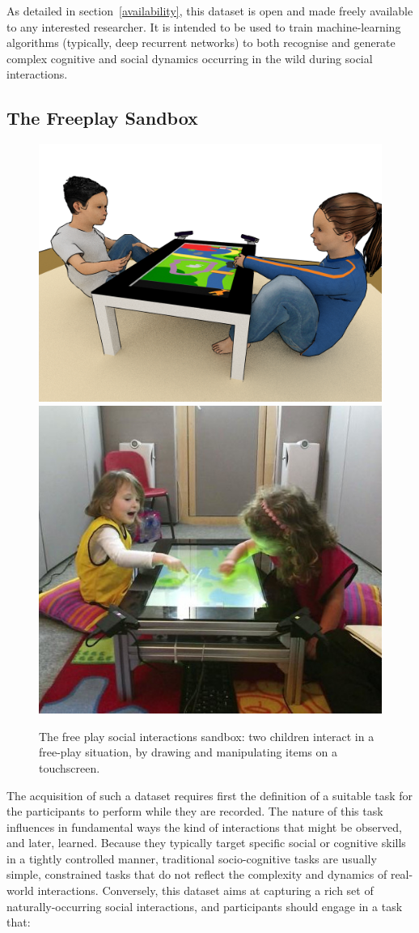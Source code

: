 \documentclass{article}
\begin{document}
As detailed in section~\ref{availability}, this dataset is open and made freely
available to any interested researcher. It is intended to be used to train
machine-learning algorithms (typically, deep recurrent networks) to both
recognise and generate complex cognitive and social dynamics occurring in the
wild during social interactions.

\subsection{The Freeplay Sandbox}

\begin{figure}
    \centering
    \includegraphics[width=0.55\linewidth]{setup-child-child.png}
    \hspace{1em}
    \includegraphics[width=0.4\linewidth]{child-child-env}
    \caption{The free play social interactions sandbox: two children interact in
    a free-play situation, by drawing and manipulating items on a touchscreen.}
    \label{fig|freeplay}
\end{figure}

The acquisition of such a dataset requires first the definition of a suitable
task for the participants to perform while they are recorded. The nature of
this task influences in fundamental ways the kind of interactions that might be
observed, and later, learned. Because they typically target specific social
or cognitive skills in a tightly controlled manner, traditional socio-cognitive tasks are
usually simple, constrained tasks that do not reflect the complexity and dynamics of
real-world interactions. Conversely, this dataset aims at capturing a rich set
of naturally-occurring social interactions, and participants should engage in a task that:
\end{document}
